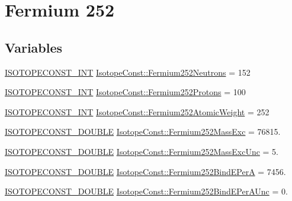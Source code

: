 \hypertarget{group___isotope_const-_fermium-_fm252}{}\section{Fermium 252}
\label{group___isotope_const-_fermium-_fm252}
\subsection*{Variables}
\begin{DoxyCompactItemize}
\item 
\mbox{\hyperlink{group___isotope_const-_macros_ga5f18360b3e99483a35c32d789e62621c}{I\+S\+O\+T\+O\+P\+E\+C\+O\+N\+S\+T\+\_\+\+I\+NT}} \mbox{\hyperlink{group___isotope_const-_fermium-_fm252_ga93c46138840d9c5a5fede9df5e827625}{Isotope\+Const\+::\+Fermium252\+Neutrons}} = 152
\item 
\mbox{\hyperlink{group___isotope_const-_macros_ga5f18360b3e99483a35c32d789e62621c}{I\+S\+O\+T\+O\+P\+E\+C\+O\+N\+S\+T\+\_\+\+I\+NT}} \mbox{\hyperlink{group___isotope_const-_fermium-_fm252_ga8841f4b7d6948df80e78d44cb6895583}{Isotope\+Const\+::\+Fermium252\+Protons}} = 100
\item 
\mbox{\hyperlink{group___isotope_const-_macros_ga5f18360b3e99483a35c32d789e62621c}{I\+S\+O\+T\+O\+P\+E\+C\+O\+N\+S\+T\+\_\+\+I\+NT}} \mbox{\hyperlink{group___isotope_const-_fermium-_fm252_ga7154fb144236f932171dba6284e74490}{Isotope\+Const\+::\+Fermium252\+Atomic\+Weight}} = 252
\item 
\mbox{\hyperlink{group___isotope_const-_macros_ga8f45a7272ce02c0b4c65c44636ed719a}{I\+S\+O\+T\+O\+P\+E\+C\+O\+N\+S\+T\+\_\+\+D\+O\+U\+B\+LE}} \mbox{\hyperlink{group___isotope_const-_fermium-_fm252_gae7906b0b1d84ec18654b54b4d20145a7}{Isotope\+Const\+::\+Fermium252\+Mass\+Exc}} = 76815.
\item 
\mbox{\hyperlink{group___isotope_const-_macros_ga8f45a7272ce02c0b4c65c44636ed719a}{I\+S\+O\+T\+O\+P\+E\+C\+O\+N\+S\+T\+\_\+\+D\+O\+U\+B\+LE}} \mbox{\hyperlink{group___isotope_const-_fermium-_fm252_gaca2c4a4c7d978dc10cec460e84f17781}{Isotope\+Const\+::\+Fermium252\+Mass\+Exc\+Unc}} = 5.
\item 
\mbox{\hyperlink{group___isotope_const-_macros_ga8f45a7272ce02c0b4c65c44636ed719a}{I\+S\+O\+T\+O\+P\+E\+C\+O\+N\+S\+T\+\_\+\+D\+O\+U\+B\+LE}} \mbox{\hyperlink{group___isotope_const-_fermium-_fm252_ga6f60557b1bac7727719e654708d7b78f}{Isotope\+Const\+::\+Fermium252\+Bind\+E\+PerA}} = 7456.
\item 
\mbox{\hyperlink{group___isotope_const-_macros_ga8f45a7272ce02c0b4c65c44636ed719a}{I\+S\+O\+T\+O\+P\+E\+C\+O\+N\+S\+T\+\_\+\+D\+O\+U\+B\+LE}} \mbox{\hyperlink{group___isotope_const-_fermium-_fm252_gad5429ddc5ba116bea3a4c47a299a1424}{Isotope\+Const\+::\+Fermium252\+Bind\+E\+Per\+A\+Unc}} = 0.

\end{DoxyCompactItemize}
